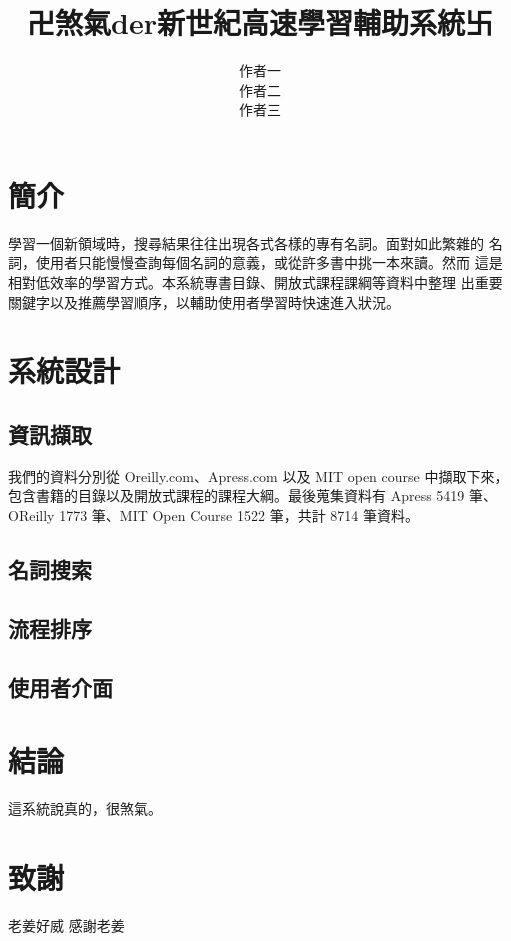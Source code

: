 \documentclass[twocolumn]{article}
\begin{document}
\title{卍煞氣der新世紀高速學習輔助系統卐}

\author{
\alignauthor 作者一 \\
\alignauthor 作者二 \\
\alignauthor 作者三\\
\and
}
\date{}
\maketitle
\thispagestyle{empty}

\section{簡介}
學習一個新領域時，搜尋結果往往出現各式各樣的專有名詞。面對如此繁雜的
名詞，使用者只能慢慢查詢每個名詞的意義，或從許多書中挑一本來讀。然而
這是相對低效率的學習方式。本系統專書目錄、開放式課程課綱等資料中整理
出重要關鍵字以及推薦學習順序，以輔助使用者學習時快速進入狀況。

\section{系統設計}


\subsection{資訊擷取}
我們的資料分別從 Oreilly.com、Apress.com 以及 MIT open course 中擷取下來，
包含書籍的目錄以及開放式課程的課程大綱。最後蒐集資料有 Apress 5419 筆、
OReilly 1773 筆、MIT Open Course 1522 筆，共計 8714 筆資料。

\subsection{名詞搜索}


\subsection{流程排序}


\subsection{使用者介面}


\section{結論}
這系統說真的，很煞氣。

\section{致謝}
老姜好威 感謝老姜
\end{document}
